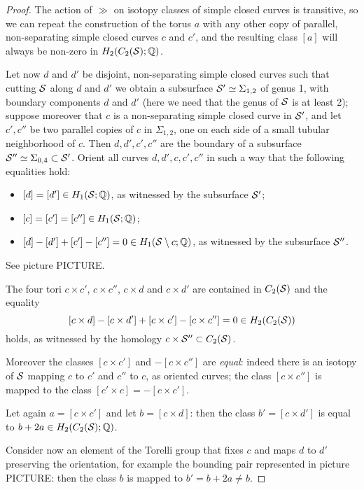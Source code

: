\begin{proof}
The action of $\gg$ on isotopy classes of simple closed curves is transitive, so we can repeat
the construction of the torus $a$ with any other copy of parallel, non-separating simple closed curves
$c$ and $c'$, and the resulting class $[a]$ will always be non-zero in $H_2(C_2(\S);\Q)$.

Let now $d$ and $d'$ be disjoint, non-separating simple closed curves such that
cutting $\S$ along $d$ and $d'$ we obtain a subsurface $\S'\simeq\Sigma_{1,2}$ of genus 1, with boundary
components $d$ and $d'$ (here we need that the genus of $\S$ is at least 2);
suppose moreover that $c$ is a non-separating simple closed curve in $\S'$,
and let $c',c''$ be two parallel copies of $c$ in $\Sigma_{1,2}$, one on each side of a small tubular
neighborhood of $c$.
Then $d,d',c',c''$ are the boundary of a subsurface $\S''\simeq\Sigma_{0,4}\subset\S'$.
Orient all curves $d,d',c,c',c''$ in such a way that the following equalities hold:
\begin{itemize}
 \item $[d]=[d']\in H_1(\S;\Q)$, as witnessed by the subsurface $\S'$;
 \item $[c]=[c']=[c'']\in H_1(\S;\Q)$;
 \item $[d]-[d']+[c']-[c'']=0\in H_1(\S\setminus c;\Q)$, as witnessed by the subsurface $\S''$.
\end{itemize}
See picture PICTURE.

The four tori $c\times c'$, $c\times c''$, $c\times d$ and $c\times d'$ are contained in $C_2(\S)$
and the equality
\[
 [c\times d]-[c\times d']+[c\times c']-[c\times c'']=0\in H_2(C_2(\S))
\]
holds, as witnessed by the homology $c\times \S''\subset C_2(\S)$.

Moreover the classes $[c\times c']$ and $-[c\times c'']$ are \emph{equal}:
indeed there is an isotopy of $\S$ mapping $c$ to $c'$ and $c''$ to $c$,
as oriented curves; the class $[c\times c'']$ is mapped to the class $[c'\times c]=-[c\times c']$.

Let again $a=[c\times c']$ and let $b=[c\times d]$: then the class $b'=[c\times d']$
is equal to $b+2a\in H_2(C_2(\S);\Q)$.

Consider now an element of the Torelli group that fixes $c$ and maps $d$ to $d'$ preserving
the orientation, for example the bounding pair represented in picture PICTURE:
then the class $b$ is mapped to $b'=b+2a\neq b$.
\end{proof}